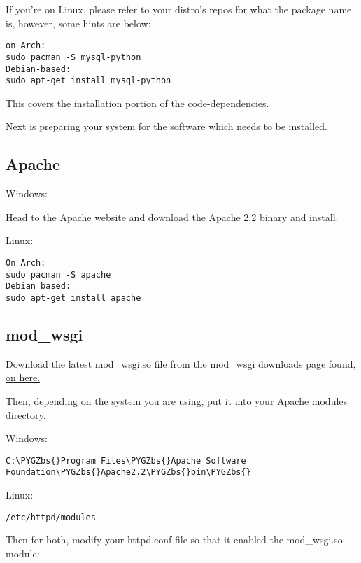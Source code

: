 \documentclass[letterpaper,10pt,english]{sphinxmanual}
\def\PYGZbs{\char`\\}
\begin{document}
If you're on Linux, please refer to your distro's repos for what the package
name is, however, some hints are below:

\begin{Verbatim}[commandchars=\\\{\}]
on Arch:
sudo pacman -S mysql-python
Debian-based:
sudo apt-get install mysql-python
\end{Verbatim}

This covers the installation portion of the code-dependencies.

Next is preparing your system for the software which needs to be installed.


\subsection{Apache}
\label{deps:apache}
Windows:

Head to the Apache website and download the Apache 2.2 binary and install.

Linux:

\begin{Verbatim}[commandchars=\\\{\}]
On Arch:
sudo pacman -S apache
Debian based:
sudo apt-get install apache
\end{Verbatim}


\subsection{mod\_wsgi}
\label{deps:mod-wsgi}
Download the latest mod\_wsgi.so file from the mod\_wsgi downloads page found,
\href{http://code.google.com/p/modwsgi/wiki/DownloadTheSoftware}{on here.}

Then, depending on the system you are using, put it into your Apache modules
directory.

Windows:

\begin{Verbatim}[commandchars=\\\{\}]
C:\PYGZbs{}Program Files\PYGZbs{}Apache Software Foundation\PYGZbs{}Apache2.2\PYGZbs{}bin\PYGZbs{}
\end{Verbatim}

Linux:

\begin{Verbatim}[commandchars=\\\{\}]
/etc/httpd/modules
\end{Verbatim}

Then for both, modify your httpd.conf file so that it enabled the mod\_wsgi.so
module:
\end{document}
